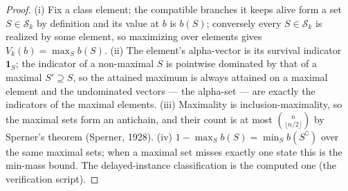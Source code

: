 \documentclass[10pt,twocolumn]{article}
\theoremstyle{plain}
\theoremstyle{definition}
\theoremstyle{remark}
\begin{document}
\begin{proof}
(i) Fix a class element; the compatible branches it keeps alive form a
set \(S \in \mathcal{S}_{k}\) by definition and its value at \(b\) is
\(b(S)\); conversely every \(S \in \mathcal{S}_{k}\) is realized by
some element, so maximizing over elements gives
\(V_{k}(b) = \max_{S} b(S)\). (ii) The element's alpha-vector is its
survival indicator \(\mathbf{1}_{S}\); the indicator of a non-maximal
\(S\) is pointwise dominated by that of a maximal \(S' \supseteq S\),
so the attained maximum is always attained on a maximal element and the
undominated vectors --- the alpha-set --- are exactly the indicators of
the maximal elements. (iii) Maximality is inclusion-maximality, so the
maximal sets form an antichain, and their count is at most
\(\binom{n}{\lfloor n/2 \rfloor}\) by Sperner's theorem (Sperner,
1928). (iv) \(1 - \max_{S} b(S) = \min_{S} b(S^{\complement})\) over
the same maximal sets; when a maximal set misses exactly one state this
is the min-mass bound. The delayed-instance classification is the
computed one (the verification script).
\end{proof}
\end{document}
